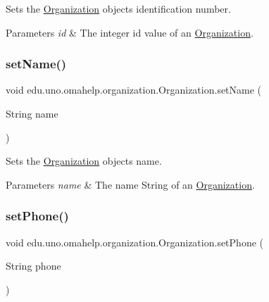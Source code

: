 Sets the \mbox{\hyperlink{classedu_1_1uno_1_1omahelp_1_1organization_1_1_organization}{Organization}} object\textquotesingle{}s identification number.


\begin{DoxyParams}{Parameters}
{\em id} & The integer id value of an \mbox{\hyperlink{classedu_1_1uno_1_1omahelp_1_1organization_1_1_organization}{Organization}}. \\
\hline
\end{DoxyParams}
\mbox{\label{classedu_1_1uno_1_1omahelp_1_1organization_1_1_organization_a2db8d9b7280b758389498f9c20542991}} 
\subsubsection{\texorpdfstring{set\+Name()}{setName()}}
{\footnotesize\ttfamily void edu.\+uno.\+omahelp.\+organization.\+Organization.\+set\+Name (\begin{DoxyParamCaption}\item[{String}]{name }\end{DoxyParamCaption})}

Sets the \mbox{\hyperlink{classedu_1_1uno_1_1omahelp_1_1organization_1_1_organization}{Organization}} object\textquotesingle{}s name.


\begin{DoxyParams}{Parameters}
{\em name} & The name String of an \mbox{\hyperlink{classedu_1_1uno_1_1omahelp_1_1organization_1_1_organization}{Organization}}. \\
\hline
\end{DoxyParams}
\mbox{\label{classedu_1_1uno_1_1omahelp_1_1organization_1_1_organization_a3484f8aa497b3d954230aa0d5bf149ad}} 
\subsubsection{\texorpdfstring{set\+Phone()}{setPhone()}}
{\footnotesize\ttfamily void edu.\+uno.\+omahelp.\+organization.\+Organization.\+set\+Phone (\begin{DoxyParamCaption}\item[{String}]{phone }\end{DoxyParamCaption})}

